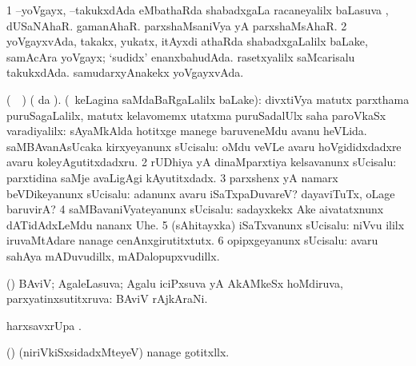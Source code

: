 {{{{{{\begin{center}
{\bentry
{} 
\gl{\saupa}
\expl{}
\bmng
\bnum
\num{1} --yoVgayx, --takukxdAda eMbathaRda shabadxgaLa racaneyalilx baLasuva \saupa, \udA\  dUSaNAhaR.  gamanAhaR.  parxshaMsaniVya yA parxshaMsAhaR. 
\num{2} yoVgayxvAda, takakx, yukatx, itAyxdi athaRda shabadxgaLalilx baLake, \udA\  samAcAra yoVgayx; `sudidx' enanxbahudAda.  rasetxyalilx saMcarisalu takukxdAda.  samudarxyAnakekx yoVgayxvAda. 
\enum
\emng
\eentry

\bentry
{} 
\gl{\kirx}
\bmng
(\parxpu\ \Eva\ ) ( \kirx da \BU). (\kanmu\ keLagina saMdaBaRgaLalilx baLake): 
\bnum
{} divxtiVya matutx parxthama puruSagaLalilx, matutx kelavomemx utatxma puruSadalUlx saha  
\banum
{} paroVkaSx varadiyalilx:  sAyaMkAlda hotitxge manege baruveneMdu avanu heVLida. 
 saMBAvanAsUcaka kirxyeyanunx sUcisalu:  oMdu veVLe avaru hoVgididxdadxre avaru koleyAgutitxdadxru. 
\eanum
\numie
\num{2} rUDhiya yA dinaMparxtiya kelsavanunx sUcisalu:  parxtidina saMje avaLigAgi kAyutitxdadx. 
\num{3} parxshenx yA namarx beVDikeyanunx sUcisalu:  adanunx avaru iSaTxpaDuvareV?  dayaviTuTx, oLage baruvirA? 
\num{4} saMBavaniVyateyanunx sUcisalu:  sadayxkekx Ake aivatatxnunx dATidAdxLeMdu nananx Uhe. 
\num{5} (sAhitayxka) iSaTxvanunx sUcisalu:  niVvu ililx iruvaMtAdare nanage cenAnxgirutitxtutx. 
\num{6} opipxgeyanunx sUcisalu:  avaru sahAya mADuvudillx, mADalopupxvudillx. 
\enum
\emng
\eentry

\bentry
{} 
\gl{\gu}
\expl{}
\bmng
(\hiV) BAviV; AgaleLasuva; Agalu iciPxsuva yA AkAMkeSx hoMdiruva, parxyatinxsutitxruva:  BAviV rAjkAraNi. 
\emng
\eentry

\bentry
{} 
\gl{\kirx}
\expl{}
\bmng
{} 
\emng
\eentry

\bentry
{} 
\bmng
harxsavxrUpa . 
\emng

\noindent
\gl{\pagu}
\expl{}
\bmng
{} (\AmA) (niriVkiSxsidadxMteyeV) nanage gotitxllx. 
\emng
\eentry

}
\end{center}}}}}}}

